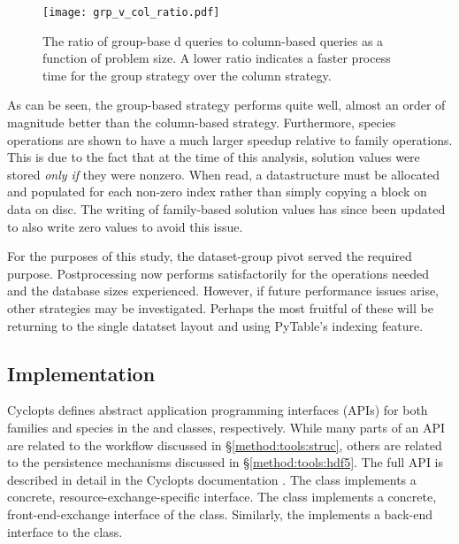 \begin{figure}
  \begin{center}
    \texttt{[image: grp\_v\_col\_ratio.pdf]}
    \caption[]{
      \label{fig:col_grp}
      The ratio of group-base d queries to column-based queries as a function of
      problem size. A lower ratio indicates a faster process time for the group
      strategy over the column strategy.}
  \end{center}
\end{figure}

As can be seen, the group-based strategy performs quite well, almost an order of
magnitude better than the column-based strategy. Furthermore, species operations
are shown to have a much larger speedup relative to family operations. This is
due to the fact that at the time of this analysis, solution values were stored
\textit{only if} they were nonzero. When read, a datastructure must be allocated
and populated for each non-zero index rather than simply copying a block on data
on disc. The writing of family-based solution values has since been updated to
also write zero values to avoid this issue.

For the purposes of this study, the dataset-group pivot served the required
purpose. Postprocessing now performs satisfactorily for the operations needed
and the database sizes experienced. However, if future performance issues arise,
other strategies may be investigated. Perhaps the most fruitful of these will be
returning to the single datatset layout and using PyTable's indexing feature. 

\subsection{Implementation}

Cyclopts defines abstract application programming interfaces (APIs) for both
families and species in the  and 
classes, respectively. While many parts of an API are related to the workflow
discussed in \S \ref{method:tools:struc}, others are related to the persistence
mechanisms discussed in \S \ref{method:tools:hdf5}. The full API is described in
detail in the Cyclopts documentation \cite{cyclopts}. The 
class implements a concrete, resource-exchange-specific 
interface. The  class implements a concrete,
front-end-exchange interface of the  class. Similarly, the
 implements a back-end interface to the class.


